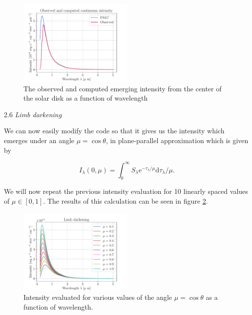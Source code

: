 \documentclass[a4paper,11.5pt,]{article}
\begin{document}
\begin{multicols}{2}
\begin{figure}[H]
    \centering
    \includegraphics[width = 0.5\textwidth]{figures/2.4/Observed_computed.pdf}
    \caption{The observed and computed emerging intensity from the center of the solar disk as a function of wavelength}
    \label{fig: i comp}
\end{figure}

 \begin{center}
2.6 \textit{Limb darkening}
\end{center}

We can now easily modify the code so that it gives us the intensity which emerges under an angle $\mu = \cos \theta$, in plane-parallel approximation which is given by

\begin{equation}
    I _ { \lambda } ( 0 , \mu ) = \int _ { 0 } ^ { \infty } S _ { \lambda } \mathrm { e } ^ { - \tau _ { \lambda } / \mu } \mathrm { d } \tau _ { \lambda } / \mu.
\end{equation}

We will now repeat the previous intensity evaluation for 10 linearly spaced values of $\mu \in [0,1]$. The results of this calculation can be seen in figure \ref{fig: limb}.
\begin{figure}[H]
    \centering
    \includegraphics[width = 0.5\textwidth]{figures/2.6/limbdark_wave.pdf}
    \caption{Intensity evaluated for various values of the angle $\mu = \cos \theta$ as a function of wavelength.}
    \label{fig: limb}
\end{figure}


\end{multicols}
\end{document}
